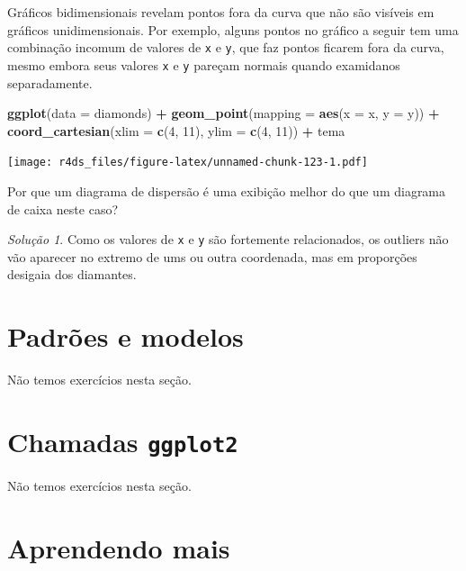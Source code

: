\documentclass[
]{latex/krantz}
\newenvironment{Shaded}{\begin{snugshade}}{\end{snugshade}}
\newcommand{\AttributeTok}[1]{\textcolor[rgb]{0.13,0.29,0.53}{#1}}
\newcommand{\DecValTok}[1]{\textcolor[rgb]{0.00,0.00,0.81}{#1}}
\newcommand{\FunctionTok}[1]{\textcolor[rgb]{0.13,0.29,0.53}{\textbf{#1}}}
\newcommand{\NormalTok}[1]{#1}
\newcommand{\SpecialCharTok}[1]{\textcolor[rgb]{0.81,0.36,0.00}{\textbf{#1}}}
\theoremstyle{definition}
\theoremstyle{definition}
\theoremstyle{definition}
\theoremstyle{definition}
\theoremstyle{remark}
\newtheorem*{solution}{Solução}
\begin{document}
Gráficos bidimensionais revelam pontos fora da curva que não são visíveis em gráficos unidimensionais. Por exemplo, alguns pontos no gráfico a seguir tem uma combinação incomum de valores de \texttt{x} e \texttt{y}, que faz pontos ficarem fora da curva, mesmo embora seus valores \texttt{x} e \texttt{y} pareçam normais quando examidanos separadamente.

\begin{Shaded}
\begin{Highlighting}[]
\FunctionTok{ggplot}\NormalTok{(}\AttributeTok{data =}\NormalTok{ diamonds) }\SpecialCharTok{+}
    \FunctionTok{geom\_point}\NormalTok{(}\AttributeTok{mapping =} \FunctionTok{aes}\NormalTok{(}\AttributeTok{x =}\NormalTok{ x, }\AttributeTok{y =}\NormalTok{ y)) }\SpecialCharTok{+}
    \FunctionTok{coord\_cartesian}\NormalTok{(}\AttributeTok{xlim =} \FunctionTok{c}\NormalTok{(}\DecValTok{4}\NormalTok{, }\DecValTok{11}\NormalTok{), }\AttributeTok{ylim =} \FunctionTok{c}\NormalTok{(}\DecValTok{4}\NormalTok{, }\DecValTok{11}\NormalTok{)) }\SpecialCharTok{+}
\NormalTok{    tema}
\end{Highlighting}
\end{Shaded}

\texttt{[image: r4ds\_files/figure-latex/unnamed-chunk-123-1.pdf]}

Por que um diagrama de dispersão é uma exibição melhor do que um diagrama de caixa neste caso?

\begin{solution}
Como os valores de \texttt{x} e \texttt{y} são fortemente relacionados, os outliers não vão aparecer no extremo de ums ou outra coordenada, mas em proporções desigaia dos diamantes.
\end{solution}

\hypertarget{padruxf5es-e-modelos}{%
\section{Padrões e modelos}\label{padruxf5es-e-modelos}}

Não temos exercícios nesta seção.

\hypertarget{chamadas-ggplot2}{%
\section{\texorpdfstring{Chamadas \texttt{ggplot2}}{Chamadas ggplot2}}\label{chamadas-ggplot2}}

Não temos exercícios nesta seção.

\hypertarget{aprendendo-mais}{%
\section{Aprendendo mais}\label{aprendendo-mais}}
\end{document}
